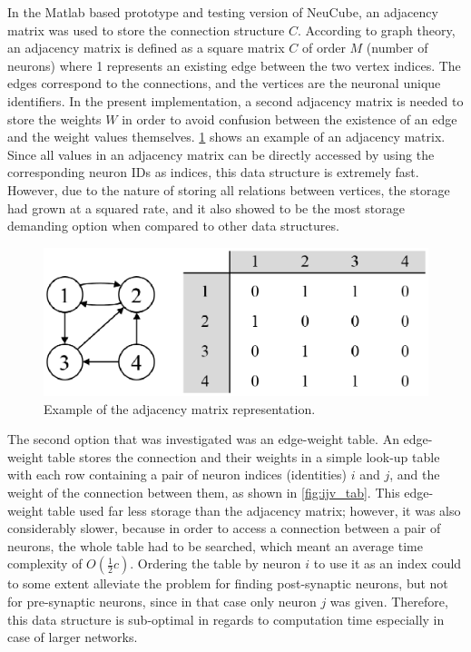 In the Matlab based prototype and testing version of NeuCube, an adjacency matrix was used to store the connection structure $C$. According to graph theory, an adjacency matrix is defined as a square matrix $C$ of order $M$ (number of neurons) where 1 represents an existing edge between the two vertex indices. The edges correspond to the connections, and the vertices are the neuronal unique identifiers. In the present implementation, a second adjacency matrix is needed to store the weights $W$ in order to avoid confusion between the existence of an edge and the weight values themselves. \figurename \ref{fig:adj_mat} shows an example of an adjacency matrix. Since all values in an adjacency matrix can be directly accessed by using the corresponding neuron IDs as indices, this data structure is extremely fast. However, due to the nature of storing all relations between vertices, the storage had grown at a squared rate, and it also showed to be the most storage demanding option when compared to other data structures. 
\begin{figure}
	\centering
	\includegraphics[width=0.5\linewidth]{fig/largesnn/adj_matrix.eps}
	\caption{Example of the adjacency matrix representation.}
	\label{fig:adj_mat}
\end{figure}

The second option that was investigated was an edge-weight table. An edge-weight table stores the connection and their weights in a simple look-up table with each row containing a pair of neuron indices (identities) $i$ and $j$, and the weight of the connection between them, as shown in \figurename \ref{fig:ijv_tab}. This edge-weight table used far less storage than the adjacency matrix; however, it was also considerably slower, because in order to access a connection between a pair of neurons, the whole table had to be searched, which meant an average time complexity of $O(\frac{1}{2}c)$. Ordering the table by neuron $i$ to use it as an index could to some extent alleviate the problem for finding post-synaptic neurons, but not for pre-synaptic neurons, since in that case only neuron $j$ was given. Therefore, this data structure is sub-optimal in regards to computation time especially in case of larger networks.


